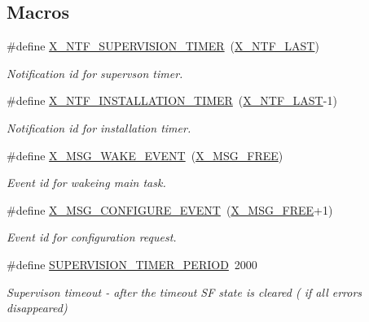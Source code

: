 \subsection*{Macros}
\begin{DoxyCompactItemize}
\item 
\#define \hyperlink{a00016_aededd1ab0a512a03f6cb0d3459b254e1}{X\+\_\+\+N\+T\+F\+\_\+\+S\+U\+P\+E\+R\+V\+I\+S\+I\+O\+N\+\_\+\+T\+I\+M\+E\+R}~(\hyperlink{a00036_a63072b0b734748ae21fd9e7435467683}{X\+\_\+\+N\+T\+F\+\_\+\+L\+A\+S\+T})
\begin{DoxyCompactList}\small\item\em Notification id for supervson timer. \end{DoxyCompactList}\item 
\#define \hyperlink{a00016_a3339ece3779a71354bcfaa90905b3a4a}{X\+\_\+\+N\+T\+F\+\_\+\+I\+N\+S\+T\+A\+L\+L\+A\+T\+I\+O\+N\+\_\+\+T\+I\+M\+E\+R}~(\hyperlink{a00036_a63072b0b734748ae21fd9e7435467683}{X\+\_\+\+N\+T\+F\+\_\+\+L\+A\+S\+T}-\/1)
\begin{DoxyCompactList}\small\item\em Notification id for installation timer. \end{DoxyCompactList}\item 
\#define \hyperlink{a00016_ae6be514b1d949dc71420a3e549772995}{X\+\_\+\+M\+S\+G\+\_\+\+W\+A\+K\+E\+\_\+\+E\+V\+E\+N\+T}~(\hyperlink{a00036_a082eb6e82ded25b00f04da4f611c961e}{X\+\_\+\+M\+S\+G\+\_\+\+F\+R\+E\+E})
\begin{DoxyCompactList}\small\item\em Event id for wakeing main task. \end{DoxyCompactList}\item 
\#define \hyperlink{a00016_a410c7d83b819fa283303a53830c87a96}{X\+\_\+\+M\+S\+G\+\_\+\+C\+O\+N\+F\+I\+G\+U\+R\+E\+\_\+\+E\+V\+E\+N\+T}~(\hyperlink{a00036_a082eb6e82ded25b00f04da4f611c961e}{X\+\_\+\+M\+S\+G\+\_\+\+F\+R\+E\+E}+1)
\begin{DoxyCompactList}\small\item\em Event id for configuration request. \end{DoxyCompactList}\item 
\#define \hyperlink{a00016_abc6f7a40b6aee60b122db32a0d82126c}{S\+U\+P\+E\+R\+V\+I\+S\+I\+O\+N\+\_\+\+T\+I\+M\+E\+R\+\_\+\+P\+E\+R\+I\+O\+D}~2000
\begin{DoxyCompactList}\small\item\em Supervison timeout -\/ after the timeout S\+F state is cleared ( if all errors disappeared) \end{DoxyCompactList}\item 

\end{DoxyCompactItemize}

